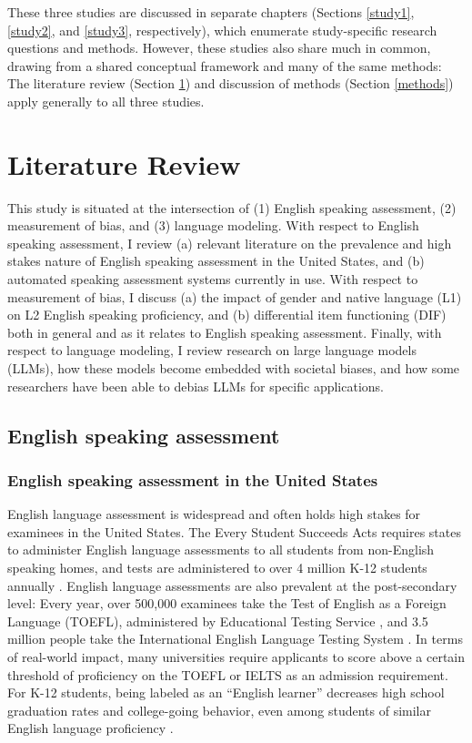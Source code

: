 \documentclass [PhD] {uclathes}
\begin{document}
These three studies are discussed in separate chapters (Sections \ref{study1}, \ref{study2}, and \ref{study3}, respectively), which enumerate study-specific research questions and methods. However, these studies also share much in common, drawing from a shared conceptual framework and many of the same methods: The literature review (Section \ref{litreview}) and discussion of methods (Section \ref{methods}) apply generally to all three studies. 



\chapter{Literature Review}
\label{litreview}

This study is situated at the intersection of (1) English speaking assessment, (2) measurement of bias, and (3) language modeling. With respect to English speaking assessment, I review (a) relevant literature on the prevalence and high stakes nature of English speaking assessment in the United States, and (b) automated speaking assessment systems currently in use. With respect to measurement of bias, I discuss (a) the impact of gender and native language (L1) on L2 English speaking proficiency, and (b) differential item functioning (DIF) both in general and as it relates to English speaking assessment. Finally, with respect to language modeling, I review research on large language models (LLMs), how these models become embedded with societal biases, and how some researchers have been able to debias LLMs for specific applications.

\section{English speaking assessment}

\subsection{English speaking assessment in the United States}
\label{englishspeaking}

English language assessment is widespread and often holds high stakes for examinees in the United States. The Every Student Succeeds Acts \citep{essa2015} requires states to administer English language assessments to all students from non-English speaking homes, and tests are administered to over 4 million K-12 students annually \citep{irwin2021report}. English language assessments are also prevalent at the post-secondary level: Every year, over 500,000 examinees take the Test of English as a Foreign Language (TOEFL), administered by Educational Testing Service \citep{ets2005}, and 3.5 million people take the International English Language Testing System \citep[IELTS;][]{ielts2023}. In terms of real-world impact, many universities require applicants to score above a certain threshold of proficiency on the TOEFL or IELTS as an admission requirement. For K-12 students, being labeled as an “English learner” decreases high school graduation rates and college-going behavior, even among students of similar English language proficiency \citep{johnson2019effects}.
\end{document}
